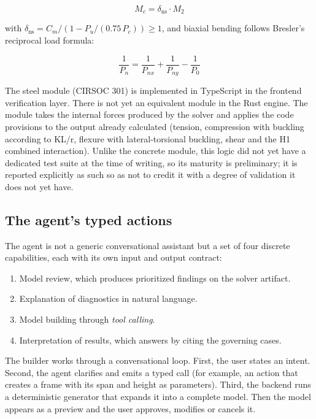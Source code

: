\documentclass[11pt,a4paper]{article}
\begin{document}
\begin{equation}
  M_c = \delta_{\text{ns}} \cdot M_2
  \label{eq:3}
\end{equation}

with $\delta_{\text{ns}} = C_m/(1 - P_u/(0.75\,P_c)) \geq 1$, and biaxial bending follows Bresler's reciprocal load formula:

\begin{equation}
  \frac{1}{P_n} = \frac{1}{P_{nx}} + \frac{1}{P_{ny}} - \frac{1}{P_0}
  \label{eq:4}
\end{equation}

The steel module (CIRSOC 301) is implemented in TypeScript in the frontend verification layer. There is not yet an equivalent module in the Rust engine. The module takes the internal forces produced by the solver and applies the code provisions to the output already calculated (tension, compression with buckling according to KL/r, flexure with lateral-torsional buckling, shear and the H1 combined interaction). Unlike the concrete module, this logic did not yet have a dedicated test suite at the time of writing, so its maturity is preliminary; it is reported explicitly as such so as not to credit it with a degree of validation it does not yet have.

\subsection{The agent's typed actions}\label{sec:5.3}

The agent is not a generic conversational assistant but a set of four discrete capabilities, each with its own input and output contract:

\begin{enumerate}
  \item Model review, which produces prioritized findings on the solver artifact.
  \item Explanation of diagnostics in natural language.
  \item Model building through \emph{tool calling}.
  \item Interpretation of results, which answers by citing the governing cases.
\end{enumerate}

The builder works through a conversational loop. First, the user states an intent. Second, the agent clarifies and emits a typed call (for example, an action that creates a frame with its span and height as parameters). Third, the backend runs a deterministic generator that expands it into a complete model. Then the model appears as a preview and the user approves, modifies or cancels it.
\end{document}
